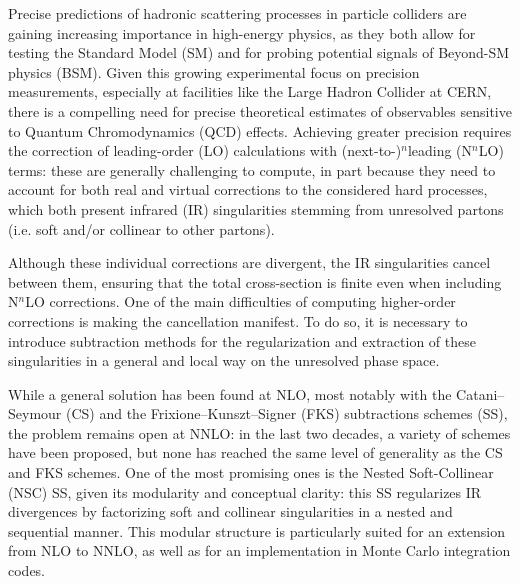 



Precise predictions of hadronic scattering processes in particle colliders are gaining increasing importance in high-energy physics, as they both allow for testing the Standard Model (SM) and for probing potential signals of Beyond-SM physics (BSM). Given this growing experimental focus on precision measurements, especially at facilities like the Large Hadron Collider at CERN, there is a compelling need for precise theoretical estimates of observables sensitive to Quantum Chromodynamics (QCD) effects. Achieving greater precision requires the correction of leading-order (LO) calculations with (next-to-)$ ^n $leading (N$ ^n $LO) terms: these are generally challenging to compute, in part because they need to account for both real and virtual corrections to the considered hard processes, which both present infrared (IR) singularities stemming from unresolved partons (i.e. soft and/or collinear to other partons).

Although these individual corrections are divergent, the IR singularities cancel between them, ensuring that the total cross-section is finite even when including N$ ^n $LO corrections. One of the main difficulties of computing higher-order corrections is making the cancellation manifest. To do so, it is necessary to introduce subtraction methods for the regularization and extraction of these singularities in a general and local way on the unresolved phase space.

While a general solution has been found at NLO, most notably with the Catani--Seymour (CS) and the Frixione--Kunszt--Signer (FKS) subtractions schemes (SS), the problem remains open at NNLO: in the last two decades, a variety of schemes have been proposed, but none has reached the same level of generality as the CS and FKS schemes. One of the most promising ones is the Nested Soft-Collinear (NSC) SS, given its modularity and conceptual clarity: this SS regularizes IR divergences by factorizing soft and collinear singularities in a nested and sequential manner. This modular structure is particularly suited for an extension from NLO to NNLO, as well as for an implementation in Monte Carlo integration codes.

